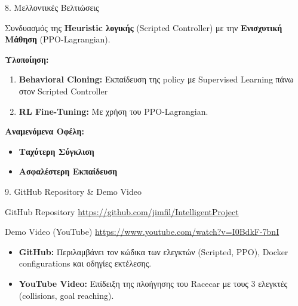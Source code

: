 \documentclass[10pt]{beamer}
\begin{document}
\begin{frame}{8. Μελλοντικές Βελτιώσεις}
	\begin{block}{}
		Συνδυασμός της \textbf{Heuristic λογικής} (Scripted Controller) με την \textbf{Ενισχυτική Μάθηση} (PPO-Lagrangian).
	\end{block}
	
	\textbf{Υλοποίηση:}
	\begin{enumerate}
		\item \textbf{Behavioral Cloning:} 
		Εκπαίδευση της policy με Supervised Learning πάνω στον Scripted Controller
		\item \textbf{RL Fine-Tuning:} 
		Με χρήση του PPO-Lagrangian.
	\end{enumerate}
	
	\vspace{0.2cm}
	\textbf{Αναμενόμενα Οφέλη:}
	\begin{itemize}
		\item \textbf{Ταχύτερη Σύγκλιση}
		\item \textbf{Ασφαλέστερη Εκπαίδευση}
	\end{itemize}
\end{frame}

\begin{frame}{9. GitHub Repository \& Demo Video}
    \begin{block}{GitHub Repository}
        \centering
        \url{https://github.com/jimfil/IntelligentProject}
    \end{block}
    
    \begin{block}{Demo Video (YouTube)}
        \centering
        \url{https://www.youtube.com/watch?v=I0BdkF-7bnI}
    \end{block}
    
    \vspace{0.3cm}
    \begin{itemize}
        \item \textbf{GitHub:} Περιλαμβάνει τον κώδικα των ελεγκτών (Scripted, PPO), Docker configurations και οδηγίες εκτέλεσης.
        \item \textbf{YouTube Video:} Επίδειξη της πλοήγησης του Racecar με τους 3 ελεγκτές (collisions, goal reaching).
    \end{itemize}
\end{frame}
\end{document}

